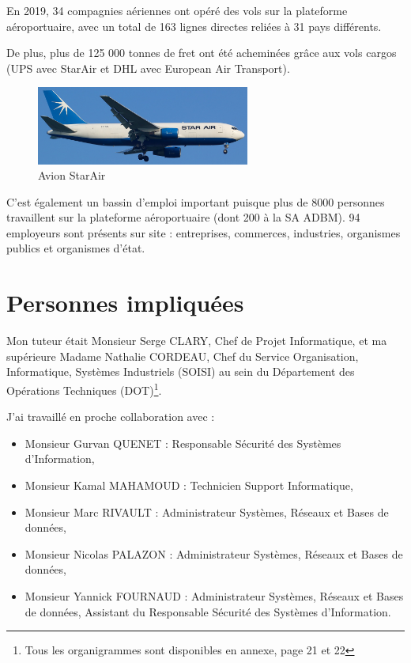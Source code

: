 En 2019, 34 compagnies aériennes ont opéré des vols sur la plateforme aéroportuaire, avec un total de 163 lignes directes reliées à 31 pays différents.

De plus, plus de 125 000 tonnes de fret ont été acheminées grâce aux vols cargos (UPS avec StarAir et DHL avec European Air Transport).

\begin{figure}[hbt!]
  \centering
  \includegraphics[width=7cm]{Images/starair.jpg}
  \caption{Avion StarAir}
  \label{fig:starair}
\end{figure}

C'est également un bassin d'emploi important puisque plus de 8000 personnes travaillent sur la plateforme aéroportuaire (dont 200 à la SA ADBM). 94 employeurs sont présents sur site : entreprises, commerces, industries, organismes publics et organismes d'état.

\newpage

\section{Personnes impliquées}


Mon tuteur était Monsieur Serge CLARY, Chef de Projet Informatique, et ma supérieure Madame Nathalie CORDEAU, Chef du Service Organisation, Informatique, Systèmes Industriels (SOISI) au sein du Département des Opérations Techniques (DOT)\footnote{Tous les organigrammes sont disponibles en annexe, page 21 et 22}.\newline

J'ai travaillé en proche collaboration avec :

\begin{itemize}
    \item Monsieur Gurvan QUENET : Responsable Sécurité des Systèmes d'Information,
    \item Monsieur Kamal MAHAMOUD : Technicien Support Informatique,
    \item Monsieur Marc RIVAULT : Administrateur Systèmes, Réseaux et Bases de données,
    \item Monsieur Nicolas PALAZON : Administrateur Systèmes, Réseaux et Bases de données,
    \item Monsieur Yannick FOURNAUD : Administrateur Systèmes, Réseaux et Bases de données, Assistant du Responsable Sécurité des Systèmes d'Information.\newline
\end{itemize}

